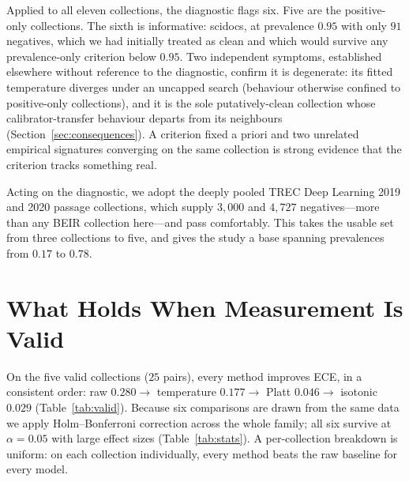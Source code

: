 \documentclass[sigconf,nonacm]{acmart}
\begin{document}
Applied to all eleven collections, the diagnostic flags six. Five are the
positive-only collections. The sixth is informative: scidocs, at prevalence $0.95$
with only $91$ negatives, which we had initially treated as clean and which would
survive any prevalence-only criterion below $0.95$. Two independent symptoms,
established elsewhere without reference to the diagnostic, confirm it is degenerate:
its fitted temperature diverges under an uncapped search (behaviour otherwise confined
to positive-only collections), and it is the sole putatively-clean collection whose
calibrator-transfer behaviour departs from its neighbours
(Section~\ref{sec:consequences}). A criterion fixed a priori and two unrelated
empirical signatures converging on the same collection is strong evidence that the
criterion tracks something real.

Acting on the diagnostic, we adopt the deeply pooled TREC Deep Learning 2019 and 2020
passage collections, which supply $3{,}000$ and $4{,}727$ negatives---more than any
BEIR collection here---and pass comfortably. This takes the usable set from three
collections to five, and gives the study a base spanning prevalences from $0.17$ to
$0.78$.

\section{What Holds When Measurement Is Valid}\label{sec:valid}

On the five valid collections ($25$ pairs), every method improves ECE, in a consistent
order: raw $0.280 \to$ temperature $0.177 \to$ Platt $0.046 \to$ isotonic $0.029$
(Table~\ref{tab:valid}). Because six comparisons are drawn from the same data we apply
Holm--Bonferroni correction across the whole family; all six survive at
$\alpha{=}0.05$ with large effect sizes (Table~\ref{tab:stats}). A per-collection
breakdown is uniform: on each collection individually, every method beats the raw
baseline for every model.
\end{document}
